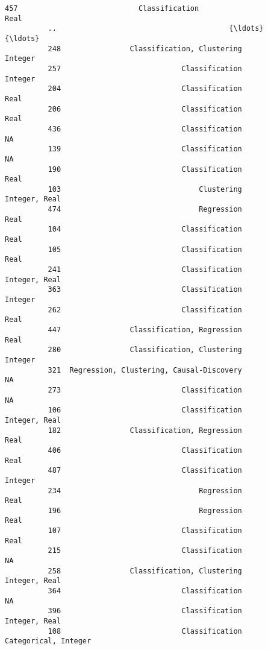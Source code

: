 \documentclass[11pt]{article}
\begin{document}
\begin{Verbatim}[commandchars=\\\{\}]
          457                            Classification                        Real   
          ..                                        {\ldots}                         {\ldots}   
          248                Classification, Clustering                     Integer   
          257                            Classification                     Integer   
          204                            Classification                        Real   
          206                            Classification                        Real   
          436                            Classification                          NA   
          139                            Classification                          NA   
          190                            Classification                        Real   
          103                                Clustering               Integer, Real   
          474                                Regression                        Real   
          104                            Classification                        Real   
          105                            Classification                        Real   
          241                            Classification               Integer, Real   
          363                            Classification                     Integer   
          262                            Classification                        Real   
          447                Classification, Regression                        Real   
          280                Classification, Clustering                     Integer   
          321  Regression, Clustering, Causal-Discovery                          NA   
          273                            Classification                          NA   
          106                            Classification               Integer, Real   
          182                Classification, Regression                        Real   
          406                            Classification                        Real   
          487                            Classification                     Integer   
          234                                Regression                        Real   
          196                                Regression                        Real   
          107                            Classification                        Real   
          215                            Classification                          NA   
          258                Classification, Clustering               Integer, Real   
          364                            Classification                          NA   
          396                            Classification               Integer, Real   
          108                            Classification        Categorical, Integer   
          

\end{Verbatim}
\end{document}
